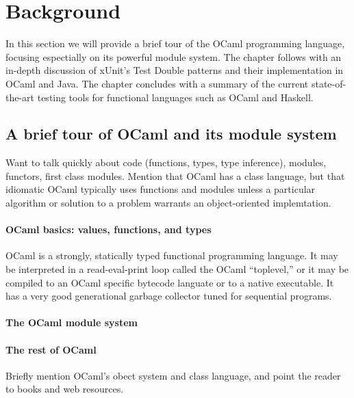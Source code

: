 \chapter{Background}
\label{background}

In this section we will provide a brief tour of the OCaml programming
language, focusing espectially on its powerful module system. The
chapter follows with an in-depth discussion of xUnit's Test Double
patterns and their implementation in OCaml and Java. The chapter
concludes with a summary of the current state-of-the-art testing tools
for functional languages such as OCaml and Haskell.

\section{A brief tour of OCaml and its module system}
\label{ocaml}


Want to talk quickly about code (functions, types, type inference),
modules, functors, first class modules. Mention that OCaml has a class
language, but that idiomatic OCaml typically uses functions and
modules unless a particular algorithm or solution to a problem
warrants an object-oriented implemtation.

\subsubsection{OCaml basics: values, functions, and types}

OCaml is a strongly, statically typed functional programming
language. It may be interpreted in a read-eval-print loop called the
OCaml ``toplevel,'' or it may be compiled to an OCaml specific
bytecode languate or to a native executable.\cite{ocaml:spec} It has a
very good generational garbage collector tuned for sequential
programs.\cite{ocaml:gc_tutorial}

\subsubsection{The OCaml module system}

\subsubsection{The rest of OCaml}

Briefly mention OCaml's obect system and class language, and point the
reader to books and web resources.

